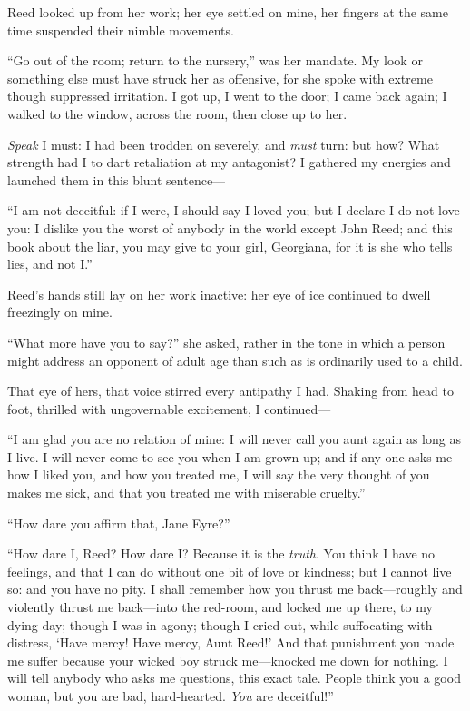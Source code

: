 \Mrs{} Reed looked up from her work; her eye settled on mine, her fingers
at the same time suspended their nimble movements.

\enquote{Go out of the room; return to the nursery,} was her mandate. 
My look or something else must have struck her as offensive, for she
spoke with extreme though suppressed irritation. I got up, I went to
the door; I came back again; I walked to the window, across the room,
then close up to her.

\emph{Speak} I must: I had been trodden on severely, and \emph{must}
turn: but how? What strength had I to dart retaliation at my
antagonist? I gathered my energies and launched them in this blunt
sentence---

\enquote{I am not deceitful: if I were, I should say I loved you; but I
declare I do not love you: I dislike you the worst of anybody in the
world except John Reed; and this book about the liar, you may give to
your girl, Georgiana, for it is she who tells lies, and not I\@.}

\Mrs{} Reed's hands still lay on her work inactive: her eye of ice
continued to dwell freezingly on mine.

\enquote{What more have you to say?} she asked, rather in the tone in
which a person might address an opponent of adult age than such as is
ordinarily used to a child.

That eye of hers, that voice stirred every antipathy I had. Shaking
from head to foot, thrilled with ungovernable excitement, I continued---

\enquote{I am glad you are no relation of mine: I will never call you
aunt again as long as I live. I will never come to see you when I am
grown up; and if any one asks me how I liked you, and how you treated
me, I will say the very thought of you makes me sick, and that you
treated me with miserable cruelty.}

\enquote{How dare you affirm that, Jane Eyre?}

\enquote{How dare I, \Mrs{} Reed? How dare I? Because it is the \emph{truth}. 
You think I have no feelings, and that I can do without one bit of love
or kindness; but I cannot live so: and you have no pity. I shall
remember how you thrust me back---roughly and violently thrust me
back---into the red-room, and locked me up there, to my dying day;
though I was in agony; though I cried out, while suffocating with
distress, \enquote{Have mercy! Have mercy, Aunt Reed!} And that
punishment you made me suffer because your wicked boy struck
me---knocked me down for nothing. I will tell anybody who asks me
questions, this exact tale. People think you a good woman, but you are
bad, hard-hearted. \emph{You} are deceitful!}

